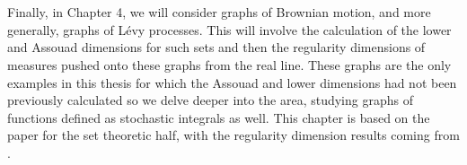 \\ \\
Finally, in Chapter 4, we will consider graphs of Brownian motion, and more generally, graphs of L\'evy processes. This will involve the calculation of the lower and Assouad dimensions for such sets and then the regularity dimensions of measures pushed onto these graphs from the real line. These graphs are the only examples in this thesis for which the Assouad and lower dimensions had not been previously calculated so we delve deeper into the area, studying graphs of functions defined as stochastic integrals as well. This chapter is based on the paper \cite{howroyd-yu} for the set theoretic half, with the regularity dimension results coming from \cite{howroyd}.
